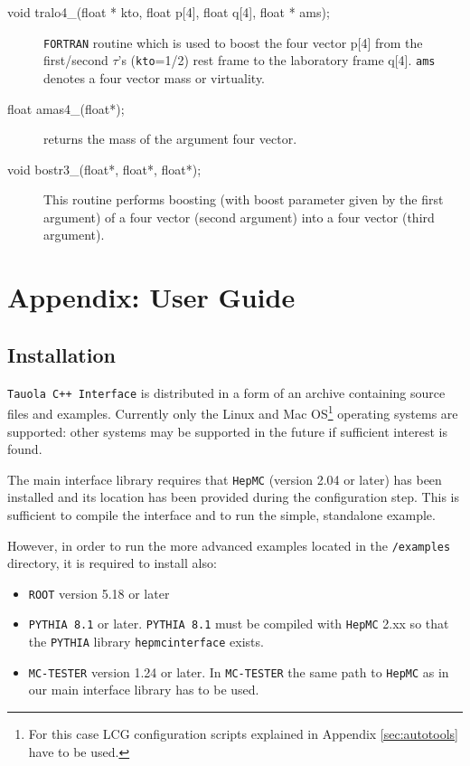 \documentclass[]{Tauola_interface_design}
\begin{document}
\begin{description}
\item[void tralo4\_(float * kto, float p{[}4{]}, float q{[4]}, float * ams);]
 {\tt FORTRAN} routine which is used to boost the four vector p[4] from the first/second
$\tau$'s ({\tt kto}=1/2)  rest frame to the laboratory frame q[4]. {\tt ams} denotes a four 
vector mass or virtuality.
\end{description}

\begin{description}
\item[float amas4\_(float*);] returns the mass of the argument four vector.
\end{description}

\begin{description}
\item[void bostr3\_(float*, float*, float*);] This routine performs boosting 
(with boost parameter given by the first argument) of a four vector (second argument)
into a four vector (third argument). 
\end{description}




\section{Appendix: User Guide}
\label{sec:User Guide}
\subsection{Installation}
\label{sec:Installation}
{\tt Tauola C++ Interface} is distributed in a form of an archive containing source files and examples.
Currently only the Linux and Mac OS\footnote{For this case LCG configuration 
scripts explained in Appendix \ref{sec:autotools} have to be used.} operating systems are supported: other systems may be
supported in the future if sufficient interest is found.

The main interface library requires that {\tt HepMC} \cite{Dobbs:2001ck} (version 2.04 or later)  has been installed
and its location has been provided during the configuration step. This is sufficient to compile the interface and to run the simple, standalone example.

However, in order to run the more advanced examples located in the {\tt /examples} directory, it is required to install also:

\begin{itemize}
  \item {\tt ROOT} \cite{root-install-www} version 5.18 or later
  \item {\tt PYTHIA 8.1} \cite{Sjostrand:2007gs} or later. {\tt PYTHIA 8.1} must be compiled with {\tt HepMC} 2.xx
        so that the {\tt PYTHIA} library {\tt hepmcinterface} exists.
  \item {\tt MC-TESTER} \cite{Golonka:2002rz,Davidson:2008ma} version 1.24 or later.
        In {\tt MC-TESTER}  the same path to {\tt HepMC} as in our main interface library has to be used.
\end{itemize}
\end{document}
